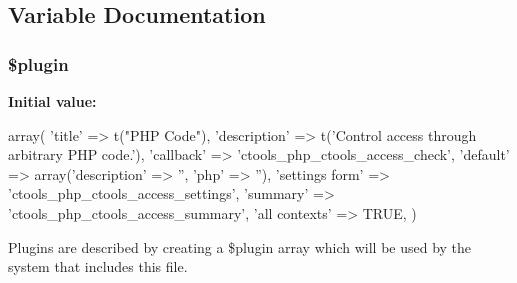\subsection{Variable Documentation}
\hypertarget{php_8inc_ada8a7130088351710bb02ed622d6bf65}{
\subsubsection[{\$plugin}]{\setlength{\rightskip}{0pt plus 5cm}\$plugin}}
\label{php_8inc_ada8a7130088351710bb02ed622d6bf65}
{\bfseries Initial value:}
\begin{DoxyCode}
 array(
  'title' => t("PHP Code"),
  'description' => t('Control access through arbitrary PHP code.'),
  'callback' => 'ctools_php_ctools_access_check',
  'default' => array('description' => '', 'php' => ''),
  'settings form' => 'ctools_php_ctools_access_settings',
  'summary' => 'ctools_php_ctools_access_summary',
  'all contexts' => TRUE,
)
\end{DoxyCode}
Plugins are described by creating a \$plugin array which will be used by the system that includes this file. 